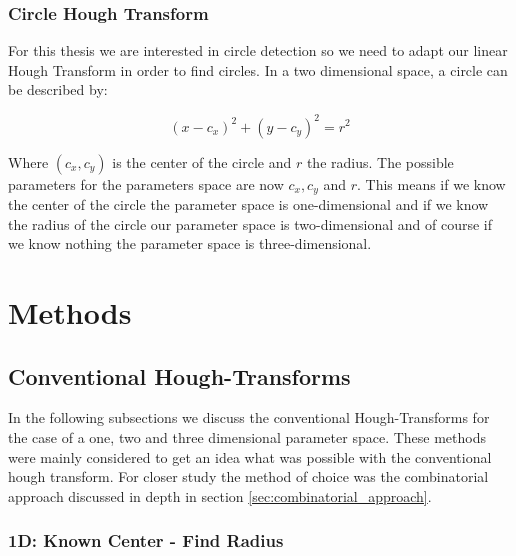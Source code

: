 \documentclass[10pt,twoside]{scrreprt}
\begin{document}


\subsection{Circle Hough Transform} %
\label{sub:circle_hough_transform}

For this thesis we are interested in circle detection so we need to adapt our linear Hough Transform in order to find circles. In a two dimensional space, a circle can be described by:

\begin{equation}
		(x-c_x)^2 + (y-c_y)^2 = r^2
\end{equation}

Where $(c_x,c_y)$ is the center of the circle and $r$ the radius. The possible parameters for the parameters space are now $c_x, c_y$ and $r$. This means if we know the center of the circle the parameter space is one-dimensional and if we know the radius of the circle our parameter space is two-dimensional and of course if we know nothing the parameter space is three-dimensional.





\chapter{Methods}

\section{Conventional Hough-Transforms} %
\label{sec:conventional_hough_transforms}

In the following subsections we discuss the conventional Hough-Transforms for the case of a one, two and three dimensional parameter space. These
methods were mainly considered to get an idea what was possible with the conventional hough transform. For closer study the method of choice was
the combinatorial approach discussed in depth in section \ref{sec:combinatorial_approach}.

\subsection{1D: Known Center - Find Radius} %
\label{sub:1d_known_center_find_radius}
\end{document}
